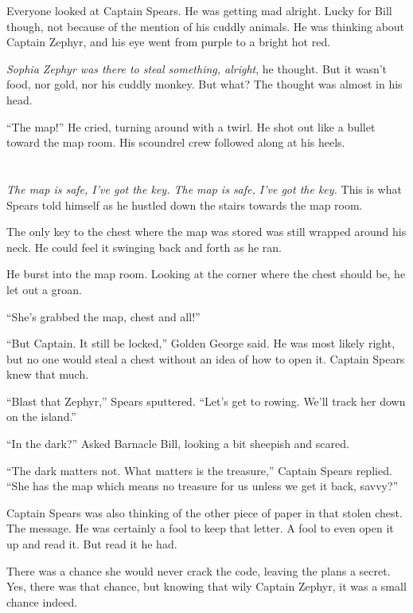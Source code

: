 \documentclass[12pt]{extbook}
\begin{document}
  Everyone looked at Captain Spears. He was getting mad alright. Lucky for
  Bill though, not because of the mention of his cuddly animals. He was
  thinking about Captain Zephyr, and his eye went from purple to a bright
  hot red.
  
  \emph{Sophia Zephyr was there to steal something, alright}, he thought.
  But it wasn't food, nor gold, nor his cuddly monkey. But what? The
  thought was almost in his head.
  
  \enquote{The map!} He cried, turning around with a twirl. He shot out
  like a bullet toward the map room. His scoundrel crew followed along at
  his heels.
  
  \section{}\label{section-9}
  
  \emph{The map is safe, I've got the key. The map is safe, I've got the
  key.} This is what Spears told himself as he hustled down the stairs
  towards the map room.
  
  The only key to the chest where the map was stored was still wrapped
  around his neck. He could feel it swinging back and forth as he ran.
  
  He burst into the map room. Looking at the corner where the chest should
  be, he let out a groan.
  
  \enquote{She's grabbed the map, chest and all!}
  
  \enquote{But Captain. It still be locked,} Golden George said. He was
  most likely right, but no one would steal a chest without an idea of how
  to open it. Captain Spears knew that much.
  
  \enquote{Blast that Zephyr,} Spears sputtered. \enquote{Let's get to
  rowing. We'll track her down on the island.}
  
  \enquote{In the dark?} Asked Barnacle Bill, looking a bit sheepish and
  scared.
  
  \enquote{The dark matters not. What matters is the treasure,} Captain
  Spears replied. \enquote{She has the map which means no treasure for us
  unless we get it back, savvy?}
  
  Captain Spears was also thinking of the other piece of paper in that
  stolen chest. The message. He was certainly a fool to keep that letter.
  A fool to even open it up and read it. But read it he had.
  
  There was a chance she would never crack the code, leaving the plans a
  secret. Yes, there was that chance, but knowing that wily Captain
  Zephyr, it was a small chance indeed.
  
\end{document}
